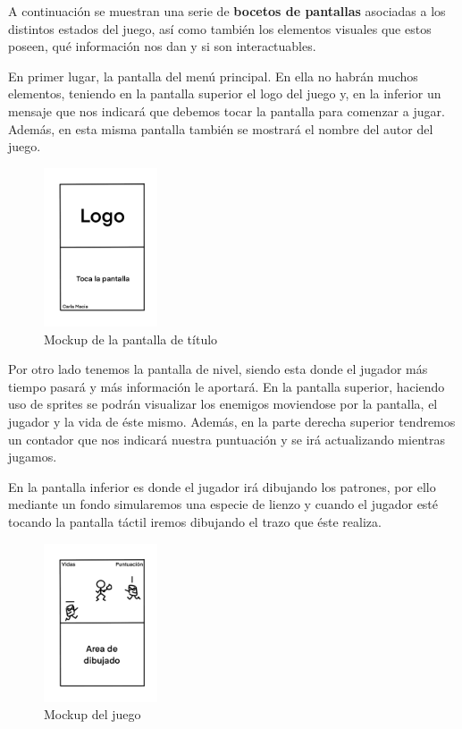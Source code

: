 A continuación se muestran una serie de \textbf{bocetos de pantallas} asociadas a los distintos estados del juego, así como también los elementos visuales que estos poseen, qué información nos dan y si son interactuables.

 \vspace{0.5cm}
 
 En primer lugar, la pantalla del menú principal. En ella no habrán muchos elementos, teniendo en la pantalla superior el logo del juego y, en la inferior un mensaje que nos indicará que debemos tocar la pantalla para comenzar a jugar. Además, en esta misma pantalla también se mostrará el nombre del autor del juego.
 
  \begin{figure}[htbp]
\centering
  \includegraphics[width=0.3\textwidth]{archivos/mockup_title.png}
  \caption{Mockup de la pantalla de título}
  \label{fig:mockup_title}
\end{figure}

 \vspace{0.5cm}
 
 Por otro lado tenemos la pantalla de nivel, siendo esta donde el jugador más tiempo pasará y más información le aportará. En la pantalla superior, haciendo uso de sprites se podrán visualizar los enemigos moviendose por la pantalla, el jugador y la vida de éste mismo. Además, en la parte derecha superior tendremos un contador que nos indicará nuestra puntuación y se irá actualizando mientras jugamos.
 
 \vspace{0.5cm}
 
 En la pantalla inferior es donde el jugador irá dibujando los patrones, por ello mediante un fondo simularemos una especie de lienzo y cuando el jugador esté tocando la pantalla táctil iremos dibujando el trazo que éste realiza.
 
 \clearpage
 
   \begin{figure}[htbp]
\centering
  \includegraphics[width=0.3\textwidth]{archivos/mockup_game.png}
  \caption{Mockup del juego}
  \label{fig:mockup_game}
\end{figure}
 
